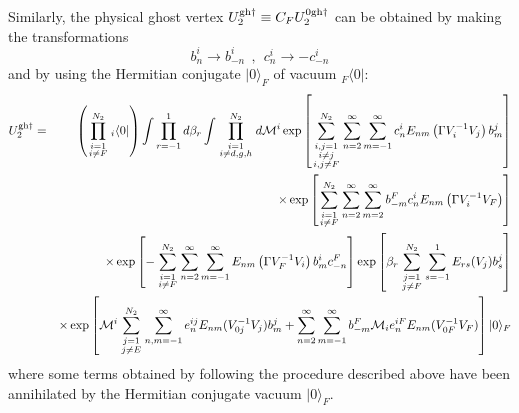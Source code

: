 \documentclass[a4paper,11pt]{article}
\begin{document}
Similarly, the physical ghost vertex $U^{{\rm gh}\dagger }_2\equiv C_FU_2^{0{\rm gh}\dagger }$ can be obtained by making the transformations
\begin{equation}
b_n^i\rightarrow b_{-n}^i\ \ ,\ \ c_n^i\rightarrow -c_{-n}^i
\end{equation}
and by using the Hermitian conjugate $|0\rangle _F$ of vacuum ${ }_F\langle 0|$:
\begin{eqnarray}
U^{{\rm gh}\dagger }_2 & = & \left( \prod_{\scriptstyle i=1\atop \scriptstyle i\neq F}^{N_2}{ }_i\langle 0|\right) \int \prod_{r=-1}^1d\beta _r\int \prod_{\scriptstyle i=1\atop \scriptstyle i\neq d,g,h}^{N_2}d{\cal M}^i \exp \left[ \sum_{{\scriptstyle i,j=1\atop \scriptstyle i\neq j}\atop \scriptstyle i,j\neq F}^{N_2}\sum_{n=2}^\infty \sum_{m=-1}^\infty c_n^iE_{nm}\left( \Gamma V^{-1}_iV_j\right) b_m^j\right] \nonumber \\
 & & \times \exp \left[ \sum_{\scriptstyle i=1\atop \scriptstyle i\neq F}^{N_2}\sum_{n=2}^\infty \sum_{m=2}^\infty b_{-m}^Fc_n^iE_{nm}\left( \Gamma V^{-1}_iV_F\right) \right] \nonumber \\ 
 & & \times \exp \left[ -\sum_{\scriptstyle i=1\atop \scriptstyle i\neq F}^{N_2}\sum_{n=2}^\infty \sum_{m=-1}^\infty E_{nm}\left( \Gamma V^{-1}_FV_i\right) b_m^ic_{-n}^F\right] \exp \left[ \beta _r\sum_{\scriptstyle j=1\atop \scriptstyle j\neq F}^{N_2}\sum_{s=-1}^1E_{rs}(V_j)b_s^j\right] \nonumber \\ 
 & & \times \exp \left[ {\cal M}^i\sum_{\scriptstyle j=1\atop \scriptstyle j\neq E}^{N_2}\sum_{n,m=-1}^\infty e_n^{ij}E_{nm}(V_{0j}^{-1}V_j)b_m^j +\sum_{n=2}^\infty \sum_{m=-1}^\infty b_{-m}^F{\cal M}_ie_n^{iF}E_{nm}(V_{0F}^{-1}V_F)\right] |0\rangle _F
\end{eqnarray}
where some terms obtained by following the procedure described above have been annihilated by the Hermitian conjugate vacuum $|0\rangle _F$.
\end{document}
